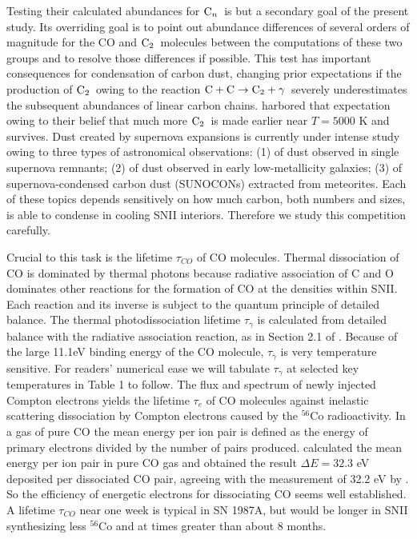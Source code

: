 \documentclass[manuscript]{aastex}
\newcommand{\ctwo}{{\rm C}_2}
\newcommand{\cenn}{{\rm C}_n}
\newcommand{\twoctoctwo}{${\rm C} + {\rm C} \to \ctwo + \gamma$}
\begin{document}
\begin{CJK*}{UTF8}{gbsn}
Testing their calculated abundances for $\cenn$\ is but a secondary 
goal of the present study. Its overriding goal is to point out 
abundance differences of several orders of magnitude for the CO 
and $\ctwo$\ molecules between the computations of these two groups 
and to resolve those differences if possible. This test has 
important consequences for condensation of carbon dust, changing 
prior expectations if the production of $\ctwo$\ owing to the reaction 
\twoctoctwo\ severely underestimates the subsequent abundances of 
linear carbon chains. \citet{2010ApJ...713....1C} harbored that 
expectation owing to their belief that much more $\ctwo$\ is 
made earlier near $T = 5000$ K and survives. Dust created by 
supernova expansions is currently under intense study owing to three 
types of astronomical observations: (1) of dust observed in single 
supernova remnants; (2) of dust observed in early low-metallicity 
galaxies; (3) of supernova-condensed carbon dust (SUNOCONs) 
extracted from meteorites. Each of these topics depends sensitively on 
how much carbon, both numbers and sizes, is able to condense in 
cooling SNII interiors. Therefore we study this competition carefully.

Crucial to this task is the lifetime $\tau_{CO}$ of CO molecules. 
Thermal dissociation of CO is dominated by thermal photons because 
radiative association of C and O dominates other reactions for 
the formation of CO at the densities within SNII. Each reaction 
and its inverse is subject to the quantum principle of detailed 
balance. The thermal photodissociation lifetime $\tau_\gamma$ is 
calculated from detailed balance with the radiative association reaction, as in 
Section 2.1 of \citet{2001ApJ...562..480C}. Because of the large 11.1eV 
binding energy of the CO molecule, $\tau_\gamma$ is very temperature sensitive. 
For readers’ numerical ease we will tabulate $\tau_\gamma$ at selected key 
temperatures in Table 1 to follow. The flux and spectrum of newly 
injected Compton electrons \citep{1991ApJ...375..221C} yields the 
lifetime $\tau_e$ of CO molecules against inelastic scattering dissociation by 
Compton electrons caused by the $^{56}$Co radioactivity. In a gas of pure 
CO the mean energy per ion pair is defined as the energy of primary 
electrons divided by the number of pairs produced. 
\citet{1994ApJ...435..909L} calculated the mean energy per ion pair 
in pure CO gas and obtained the result $\Delta E = 32.3$ eV deposited 
per dissociated CO pair, agreeing with the measurement of 32.2 eV 
by \citet{1968...Klots}. So the efficiency of energetic electrons for 
dissociating CO seems well established. A lifetime $\tau_{CO}$ near one 
week is typical in SN 1987A, but would be longer in SNII 
synthesizing less $^{56}$Co and at times greater than about 8 months.


\end{CJK*}
\end{document}
